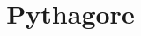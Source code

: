 \documentclass[paper=a4, fontsize=9pt]{scrartcl} %
\title{	
  \vspace{-10ex}
  \horrule{0.5pt} \\[0.4cm] %
  \huge Pythagore\\ %
  \horrule{2pt} \\[0.5cm] %
}
\author{}
\date{\vspace{-10ex}} %
\begin{document}

\newtheorem{Definition}{Définition}
\newtheorem{Theorem}{Théorème}
\newtheorem{Proposition}{Propriété}

\renewcommand{\labelitemi}{$\bullet$}
\renewcommand{\labelitemii}{$\circ$}

\maketitle %
\setlength{\columnseprule}{1pt}
\end{document}
